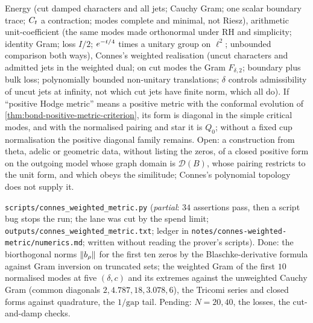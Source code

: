 \begin{observation}
\label{obs:three-metrics-dictionary}
Energy (cut damped characters and all jets; Cauchy Gram; one scalar boundary trace; $C_t$ a contraction; modes complete and
minimal, not Riesz), arithmetic unit-coefficient (the same modes made orthonormal under RH and simplicity; identity Gram;
loss $I/2$; $e^{-t/4}$ times a unitary group on $\ell^2$; unbounded comparison both ways), Connes's weighted realisation (uncut
characters and admitted jets in the weighted dual; on cut modes the Gram $F_{\delta,2}$; boundary plus bulk loss; polynomially
bounded non-unitary translations; $\delta$ controls admissibility of uncut jets at infinity, not which cut jets have finite norm,
which all do). If ``positive Hodge metric'' means a positive metric with the conformal evolution of
\cref{thm:bond-positive-metric-criterion}, its form is diagonal in the simple critical modes, and with the normalised pairing and
star it is $Q_0$; without a fixed cup normalisation the positive diagonal family remains. Open: a construction from theta,
adelic or geometric data, without listing the zeros, of a closed positive form on the outgoing model whose graph domain is
$\mathcal D(B)$, whose pairing restricts to the unit form, and which obeys the similitude; Connes's polynomial topology does not
supply it.
\end{observation}

\begin{numerical}
\label{num:connes-weighted-metric}
\texttt{scripts/connes\_weighted\_metric.py} (\emph{partial}: $34$ assertions pass, then a script bug stops the run; the lane was cut by the spend limit; \texttt{outputs/connes\_weighted\_metric.txt}; ledger in \texttt{notes/connes-weighted-metric/numerics.md}; written without reading the prover's scripts). Done: the biorthogonal norms
$\|b_\rho\|$ for the first ten zeros by the Blaschke-derivative formula against Gram inversion on truncated sets; the weighted
Gram of the first $10$ normalised modes at five $(\delta,c)$ and its extremes against the unweighted Cauchy Gram (common diagonals $2, 4.787, 18, 3.078, 6$), the Tricomi series and closed forms against quadrature, the $1/\mathrm{gap}$ tail. Pending: $N = 20,40$, the losses, the cut-and-damp checks.
\end{numerical}

